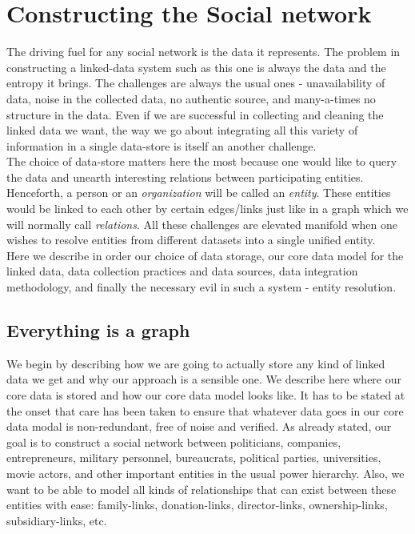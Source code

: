 \chapter{Constructing the Social network}

The driving fuel for any social network is the data it represents. The problem in constructing a linked-data system such as this one is always the data and the entropy it brings. The challenges are always the usual ones - unavailability of data, noise in the collected data, no authentic source, and many-a-times no structure in the data. Even if we are successful in collecting and cleaning the linked data we want, the way we go about integrating all this variety of information in a single data-store is itself an another challenge. \\

The choice of data-store matters here the most because one would like to query the data and unearth interesting relations between participating entities. Henceforth, a person or an \emph{organization} will be called an \emph{entity}. These entities would be linked to each other by certain edges/links just like in a graph which we will normally call \emph{relations}. All these challenges are elevated manifold when one wishes to resolve entities from different datasets into a single unified entity. \\

Here we describe in order our choice of data storage, our core data model for the linked data, data collection practices and data sources, data integration methodology, and finally the necessary evil in such a system -  entity resolution. \\

\section{Everything is a graph}
\label{datamodel}
We begin by describing how we are going to actually store any kind of linked data we get and why our approach is a sensible one. We describe here where our core data is stored and how our core data model looks like. It has to be stated at the onset that care has been taken to ensure that
whatever data goes in our core data modal is non-redundant, free of noise and verified. As already stated, our goal is to construct a social network between politicians, companies, entrepreneurs, military personnel, bureaucrats, political parties, universities, movie actors, and other important entities in the usual power hierarchy. Also, we want to be able to model all kinds of relationships that can exist between these entities with ease: family-links, donation-links, director-links, ownership-links, subsidiary-links, etc. \\

